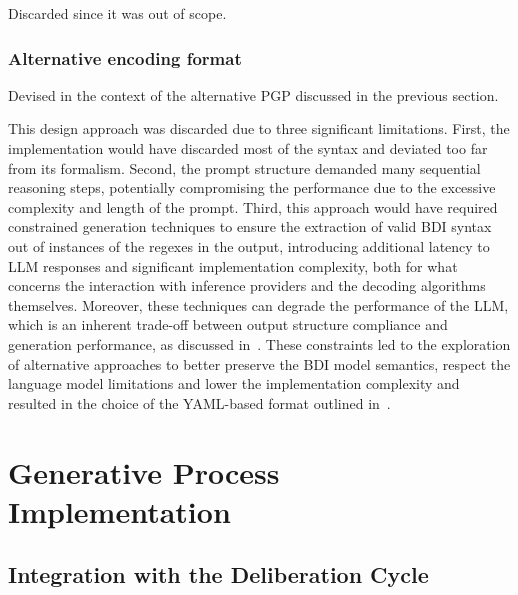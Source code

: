 \documentclass[12pt,a4paper,openright,twoside]{book}
\begin{document}
Discarded since it was out of scope.

\subsection{Alternative encoding format}

Devised in the context of the alternative PGP discussed in the previous section.


This design approach was discarded due to three significant limitations. 
%
First, the implementation would have discarded most of the \agentspeak{} syntax and deviated too far from its formalism.
%
Second, the prompt structure demanded many sequential reasoning steps, potentially compromising the performance due to the excessive complexity and length of the prompt. 
%
Third, this approach would have required constrained generation techniques to ensure the extraction of valid BDI syntax out of instances of the regexes in the output, introducing additional latency to \ac{LLM} responses and significant implementation complexity, both for what concerns the interaction with inference providers and the decoding algorithms themselves. 
%
Moreover, these techniques can degrade the performance of the \ac{LLM}, which is an inherent trade-off between output structure compliance and generation performance, as discussed in~\cite{tamLetMeSpeak2024}.
%
These constraints led to the exploration of alternative approaches to better preserve the BDI model semantics, respect the language model limitations and lower the implementation complexity and resulted in the choice of the YAML-based format outlined in~.

\chapter{Generative Process Implementation}\label{sec:implementation}

\section{Integration with the Deliberation Cycle}
\end{document}
